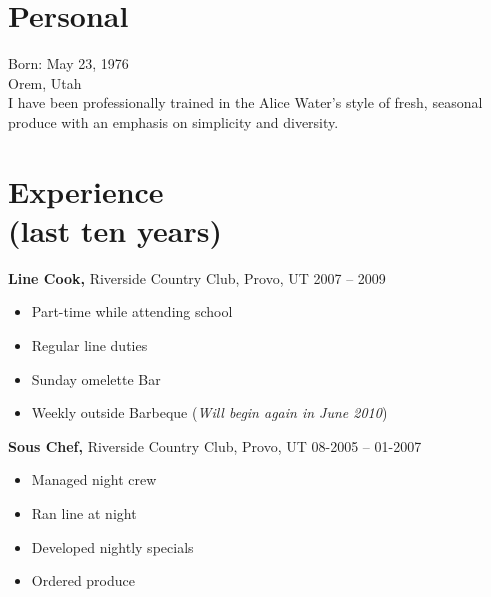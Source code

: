 \documentclass[margin]{resume}
\begin{document}
 
 


\address{630 West 500 North\\ Orem, UT 84057\\
        (801) 420-0884 \\
        bowlesling@gmail.com }
        
        

\begin{resume} 
 
\section{Personal}
Born: May 23, 1976\\ %
Orem, Utah\\
I have been professionally trained in the Alice Water's style of fresh, seasonal produce with an emphasis on simplicity and diversity.

\section{Experience\\ (last ten years)}

 
{\bf Line Cook,} Riverside Country Club, Provo, UT \hfill  2007 -- 2009
\begin{itemize} \itemsep -2pt %
\item Part-time while attending school
\item Regular line duties
\item Sunday omelette Bar
\item Weekly outside Barbeque (\textsl{Will begin again in June 2010})
\end{itemize}

{\bf Sous Chef,} Riverside Country Club, Provo, UT \hfill  08-2005 -- 01-2007
\begin{itemize} \itemsep -2pt %
\item Managed night crew 
\item Ran line at night
\item Developed nightly specials
\item Ordered produce 
\end{itemize}



\end{resume}
\end{document}
